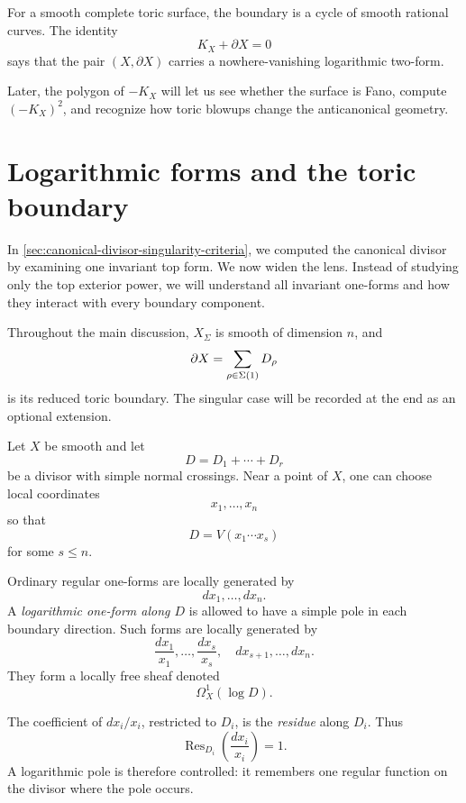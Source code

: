 \begin{surfacelaboratory}
For a smooth complete toric surface, the boundary is a cycle of smooth
rational curves. The identity
\[
K_X+\partial X=0
\]
says that the pair \((X,\partial X)\) carries a nowhere-vanishing
logarithmic two-form.

Later, the polygon of \(-K_X\) will let us see whether the surface is
Fano, compute \((-K_X)^2\), and recognize how toric blowups change the
anticanonical geometry.
\end{surfacelaboratory}

\section{Logarithmic forms and the toric boundary}
\label{sec:logarithmic-forms-toric-boundary}

In \cref{sec:canonical-divisor-singularity-criteria}, we computed the
canonical divisor by examining one invariant top form. We now widen
the lens. Instead of studying only the top exterior power, we will
understand all invariant one-forms and how they interact with every
boundary component.

Throughout the main discussion, \(X_\Sigma\) is smooth of dimension
\(n\), and
\[
\partial X
=
\sum_{\rho\in\Sigma(1)}D_\rho
\]
is its reduced toric boundary. The singular case will be recorded at
the end as an optional extension.

\begin{agcheatsheet}
Let \(X\) be smooth and let
\[
D=D_1+\cdots+D_r
\]
be a divisor with simple normal crossings. Near a point of \(X\), one
can choose local coordinates
\[
x_1,\dots,x_n
\]
so that
\[
D=V(x_1\cdots x_s)
\]
for some \(s\leq n\).

Ordinary regular one-forms are locally generated by
\[
dx_1,\dots,dx_n.
\]
A \emph{logarithmic one-form along \(D\)} is allowed to have a simple
pole in each boundary direction. Such forms are locally generated by
\[
\frac{dx_1}{x_1},\dots,\frac{dx_s}{x_s},
\quad
dx_{s+1},\dots,dx_n.
\]
They form a locally free sheaf denoted
\[
\Omega_X^1(\log D).
\]

The coefficient of \(dx_i/x_i\), restricted to \(D_i\), is the
\emph{residue} along \(D_i\). Thus
\[
\operatorname{Res}_{D_i}\!\left(\frac{dx_i}{x_i}\right)=1.
\]
A logarithmic pole is therefore controlled: it remembers one regular
function on the divisor where the pole occurs.
\end{agcheatsheet}

